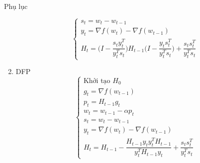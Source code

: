\documentclass[10pt]{beamer}
\theoremstyle{remark}
\theoremstyle{definition}
\begin{document}
\begin{frame}[allowframebreaks]{Phụ lục}
\begin{enumerate}
\begin{equation*}
\begin{cases}
			s_t = w_t - w_{t-1} \\
			y_t = \nabla f(w_t) - \nabla f(w_{t-1}) \\
			H_t = \Bigg(I - \dfrac{s_t y_t^T}{y_t^T s_t} \Bigg)H_{t-1}\Bigg( I - \dfrac{y_t s_t^T}{y_t^T s_t} \Bigg) + \dfrac{s_t s_t^T}{y_t^T s_t}\end{cases}
		\end{equation*}
		\framebreak
		\item DFP
		\begin{equation*}
			\begin{cases} \text{Khởi tạo } H_0 \\
			g_t = \nabla f(w_{t-1}) \\
			p_t = H_{t-1} g_t \\
			w_t = w_{t-1} - \alpha p_t \\
			s_t = w_t - w_{t-1} \\
			y_t = \nabla f(w_t) - \nabla f(w_{t-1}) \\
			H_t = H_{t-1} - \dfrac{H_{t-1}y_t y_t^T H_{t-1}}{y_t^T H_{t-1} y_t} + \dfrac{s_t s_t^T}{y_t^T s_t}\end{cases}
		\end{equation*}
	\end{enumerate}
\end{frame}
\end{document}

